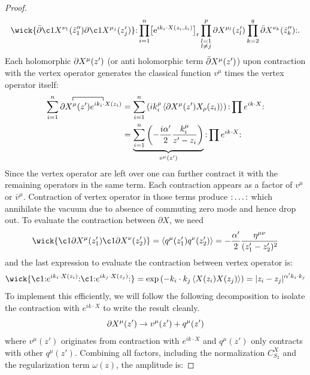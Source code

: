 \begin{tcolorbox}[breakable]
\begin{proof}
\begin{align}
	\wick{\bar\partial \c1 X^{\nu_1}(\bar z''_1)\partial \c1 X^{\mu_j}(z'_j)}
	\normal{
		\prod_{i=1}^{n}\bigl[\me^{\mi k_i\cdot X(z_i,\bar z_i)}\bigr]_{\mathrm r}
		\prod_{\substack{l=1\\ l\neq j}}^{p}\partial X^{\mu_l}(z'_l)
		\prod_{k=2}^{q}\bar\partial X^{\nu_k}(\bar z''_k)}.
\end{align}
Each holomorphic $\partial X^\mu(z')$ (or anti holomorphic term $\bar{\partial} X^\mu(z')$) upon contraction with the vertex operator generates the classical function $v^\mu$ times the vertex operator itself:
		\begin{align}
			\sum_{i=1}^n \contraction{}{X^\mu(z')}{\,}{e^{i k_i \cdot X(z_i)}}
			 \partial X^\mu(z') e^{i k_i \cdot X(z_i)}		
			&= \sum_{i=1}^n \left( i k_i^\rho \expval{\del X^\mu(z') X_\rho(z_i)} \right) \normal{\prod e^{ik \cdot X}} \nonumber \\
			&= \underbrace{\sum_{i=1}^n \left( - \frac{i \alpha'}{2} \frac{k_i^\mu}{z' - z_i} \right)}_{v^\mu(z')} \normal{\prod e^{ik \cdot X}}
		\end{align}
		Since the vertex operator are left over one can further contract it with the remaining operators in the same term. Each contraction appears as a factor of $v^{\mu}$ or $\bar v^{\mu}$. Contraction of vertex operator in those terms produce $\text{:} \ldots \text{:}$ which annihilate the vacuum due to absence of commuting zero mode and hence drop out. To evaluate the contraction between $\partial X$, we need
		\begin{equation}
			\wick{ \c1 {\del X^\mu(z_1')} \c1 {\del X^\nu(z_2')} } 
			= \expval{q^\mu(z_1') q^\nu(z_2')} 
			= -\frac{\alpha'}{2} \frac{\eta^{\mu\nu}}{(z_1' - z_2')^2}
		\end{equation}
		and the last expression to evaluate the contraction between vertex operator is:
		\begin{equation}
			\wick{ \c1 {\normal{e^{i k_i \cdot X(z_i)}}} \c1 {\normal{e^{i k_j \cdot X(z_j)}}} } 
			= \exp\left( -k_i \cdot k_j \expval{X(z_i) X(z_j)} \right)
			= |z_i - z_j|^{\alpha' k_i \cdot k_j}
		\end{equation}
		To implement this efficiently, we will follow the following decomposition to isolate the contraction with $e^{ik\cdot  X}$ to write the result cleanly. 
		\begin{equation}
			\partial X^\mu(z') \to v^\mu(z') + q^\mu(z')
		\end{equation}
		where $v^\mu(z')$ originates from contraction with $e^{ik\cdot  X}$ and $q^\mu(z')$ only contracts with other $q^\mu(z')$. Combining all factors, including the normalization $C_{S_2}^X$ and the regularization term $\omega(z)$, the amplitude is:
		

\end{proof}
\end{tcolorbox}
